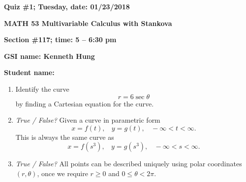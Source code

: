 \documentclass{article}
\begin{document}
{\bf Quiz \#1; Tuesday, date: 01/23/2018}

{\bf MATH 53 Multivariable Calculus with Stankova}

{\bf Section \#117; time: 5 -- 6:30 pm}

{\bf GSI name: Kenneth Hung}

{\bf Student name:}

\vspace*{0.25in}

\begin{enumerate}
\item Identify the curve
\[
r = 6 \sec \theta
\]
by finding a Cartesian equation for the curve.

\item {\em True / False?} Given a curve in parametric form
\[
x = f(t), ~~~~ y = g(t), ~~~~ -\infty < t < \infty.
\]
This is always the same curve as
\[
x = f(s^3), ~~~~ y = g(s^3), ~~~~ -\infty < s < \infty.
\]

\item {\em True / False?} All points can be described uniquely using polar coordinates $(r, \theta)$, once we require $r \ge 0$ and $0 \le \theta < 2\pi$.
\end{enumerate}
\end{document}
